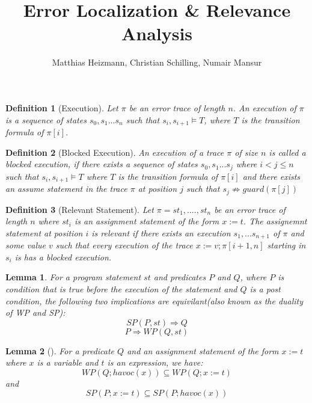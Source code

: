 \documentclass{article}
\title{Error Localization \& Relevance Analysis \\ }
\author{Matthias Heizmann, Christian Schilling, Numair Mansur}
\affil{University of Freiburg, Germany}
\date{\vspace{-5ex}}
\newcommand{\limp}{\Rightarrow}
\newtheorem{mydef}{Definition}
\newtheorem{lemma}{Lemma}
\begin{document}
\begin{mydef}[Execution]\label{mydef:execution}
Let $\pi$ be an error trace of length $n$. An execution of $\pi$ is a sequence of states $s_0, s_1 ... s_n$ such that $s_i, s_{i+1} \vDash T$, where $T$ is the transition formula of $\pi[i]$.
\end{mydef}
\begin{mydef}[Blocked Execution]\label{mydef:blocked_execution}
An execution of a trace $\pi$ of size $n$ is called a blocked execution, if there exists a sequence of states $s_0,s_1...s_j$ where $i<j \leq n$ such that $s_i, s_{i+1} \vDash T$ where $T$ is the transition formula of $\pi[i]$ and there exists an assume statement in the trace $\pi$ at position $j$ such that $s_j \not \limp guard(\pi[j])$
\end{mydef}

\begin{mydef}[Relevant Statement]\label{mydef:responsible}
Let $\pi = st_1,....,st_n$ be an error trace of length $n$ where $st_i$ is an assignment statement of the form $x:=t$. The assignemnt statement at position $i$ is relevant if there exists an execution $s_1,...s_{n+1}$ of $\pi$ and some value $v$ such that every execution of the trace $x:=v; \pi[i+1,n]$ starting in $s_i$ is has a blocked execution.
\end{mydef}

\begin{lemma}\label{lemma:duality}
For a program statement $st$ and predicates $P$ and $Q$, where $P$ is condition that is true before the execution of the statement and $Q$ is a post condition, the following two implications are equivilant(also known as the duality of WP and SP):
$$SP(P,st) \Rightarrow Q$$
$$P \Rightarrow WP(Q,st)$$
\end{lemma}

\begin{lemma}[]\label{lemma:rel_bw_assignment_and_havoc}
For a predicate $Q$ and an assignment statement of the form $x:=t$ where $x$ is a variable and $t$ is an expression, we have:
$$WP(Q; havoc(x)) \subseteq WP(Q; x:=t)$$
and
$$SP(P;x:=t) \subseteq SP(P;havoc(x))$$
\end{lemma}
\end{document}

